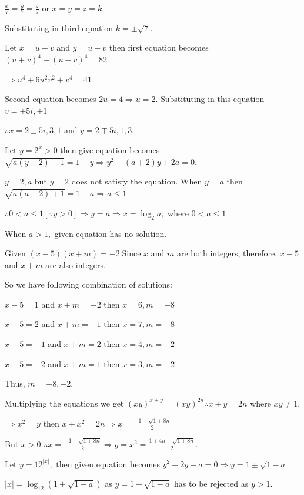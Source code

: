   $\frac{x}{7} = \frac{y}{7} = \frac{z}{7}$ or $x = y = z = k$.

  Substituting in third equation $k = \pm \sqrt{7}$.
\item Let $x = u + v$ and $y = u - v$ then first equation becomes $(u + v)^4 + (u - v)^4 = 82$

  $\Rightarrow u^4 + 6u^2v^2 + v^4 = 41$

  Second equation becomes $2u = 4 \Rightarrow u = 2$. Substituting in this equation $v = \pm 5i, \pm 1$

  $\therefore x = 2 \pm 5i, 3, 1$ and $y = 2\mp 5i, 1, 3$.
\item Let $y = 2^x > 0$ then give equation becomes $\sqrt{a(y - 2) + 1} = 1 - y\Rightarrow y^2 - (a + 2)y +
  2a = 0$.

  $y = 2, a$ but $y = 2$ does not satisfy the equation. When $y = a$ then $\sqrt{a(a - 2) + 1} = 1 - a
  \Rightarrow a \le 1$

  $\therefore 0 < a \le 1 [\because y > 0]\Rightarrow y = a \Rightarrow x =\log_2 a,$ where $0 < a \le 1$

  When $a > 1,$ given equation has no solution.
\item Given $(x - 5)(x + m) = -2$.Since $x$ and $m$ are both integers, therefore, $x - 5$ and $x + m$ are
  also integers.

  So we have following combination of solutions:

  $x - 5 = 1$ and $x + m = -2$ then $x = 6, m = -8$

  $x - 5 = 2$ and $x + m = -1$ then $x = 7, m = -8$

  $x - 5 = -1$ and $x + m = 2$ then $x = 4, m = -2$

  $x - 5 = -2$ and $x + m = 1$ then $x = 3, m = -2$

  Thus, $m = -8, -2$.
\item Multiplying the equations we get $(xy)^{x + y} = (xy)^{2n} \therefore x + y = 2n$ where $xy \ne 1$.

  $\Rightarrow x^2 = y$ then $x + x^2 = 2n\Rightarrow x = \frac{-1 \pm \sqrt{1 + 8n}}{2}$

  But $x > 0$ $\therefore x = \frac{-1 + \sqrt{1 + 8n}}{2}\Rightarrow y = x^2 = \frac{1 + 4n - \sqrt{1 +
      8n}}{2}$.
\item Let $y = 12^{|x|},$ then given equation becomes $y^2 - 2y + a = 0\Rightarrow y = 1 \pm \sqrt{1 - a}$

  $|x| = \log_{12}(1 + \sqrt{1 - a})$ as $y = 1 - \sqrt{1 - a}$ has to be rejected as $y > 1$.


